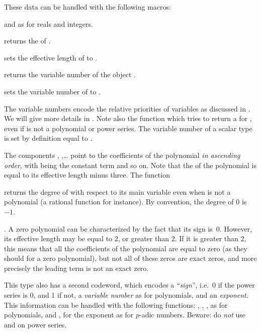 \noindent These data can be handled with the following macros:

 and  as for reals and integers.

 returns the  of .

 sets the effective length of  to
.

 returns the variable number of the object .

 sets the variable number of  to
.

The variable numbers encode the relative priorities of variables as discussed
in . We will give more details in .
Note also the function  which tries to return a
 for , even if  is not a polynomial or
power series. The variable number of a scalar type is set by definition
equal to .

The components , ,\dots {} point to the
coefficients of the polynomial \emph{in ascending order}, with 
being the constant term and so on. Note that the  of the
polynomial is equal to its effective length minus three. The function

 returns the degree of  with respect to its
main variable even when  is not a polynomial (a rational function
for instance). By convention, the degree of $0$ is~$-1$.

. A zero polynomial can be characterized by the
fact that its sign is~0. However, its effective length may be equal to 2, or
greater than 2. If it is greater than 2, this means that all the coefficients
of the polynomial are equal to zero (as they should for a zero polynomial),
but not all of these zeros are exact zeros, and more precisely the leading
term  is not an exact zero.

 This
type also has a second codeword, which encodes a ``\emph{sign}'', i.e.~0
if the power series is 0, and 1 if not, a \emph{variable number} as for
polynomials, and an \emph{exponent}. This information can be handled with
the following functions: , , ,
 as for polynomials, and ,  for the
exponent as for $p$-adic numbers. Beware: do \emph{not} use  and
 on power series.

